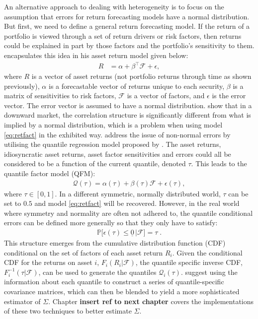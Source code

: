 \documentclass[
]{article}
\begin{document}
An alternative approach to dealing with heterogeneity is to focus on the assumption that errors for
return forecasting models have a normal distribution. But first, we need to define a general return
forecasting model. If the return of a portfolio is viewed through a set of return drivers or risk
factors, then returns could be explained in part by those factors and the portfolio's sensitivity to
them. \citet{M10} encapsulates this idea in his asset return model given below:
\begin{align}
R &= \alpha +\beta^\intercal \mathcal{F} + \epsilon, \label{eq:retfact}
\end{align}
where \(R\) is a vector of asset returns (not portfolio returns through time as shown previously),
\(\alpha\) is a forecastable vector of returns unique to each security, \(\beta\) is a matrix of
sensitivities to risk factors, \(\mathcal{F}\) is a vector of factors, and \(\epsilon\) is the error
vector. The error vector is assumed to have a normal distribution. \citet{AC02} show that in a downward
market, the correlation structure is significantly different from what is implied by a normal
distribution, which is a problem when using model \eqref{eq:retfact} in the exhibited way. \citet{CDG19}
address the issue of non-normal errors by utilising the quantile regression model proposed by
\citet{KB78}. The asset returns, idiosyncratic asset returns, asset factor sensitivities and errors could all
be considered to be a function of the current quantile, denoted \(\tau\). This leads to the quantile
factor model (QFM):
\begin{align} 
\mathcal{Q}(\tau) =  \alpha(\tau) + \beta(\tau)\mathcal{F} + \epsilon(\tau), \label{eq:qfm}
\end{align}
where \(\tau \in [0, 1]\). In a different symmetric, normally distributed world, \(\tau\) can be set to
\(0.5\) and model \eqref{eq:retfact} will be recovered. However, in the real world where symmetry and
normality are often not adhered to, the quantile conditional errors can be defined more generally so
that they only have to satisfy:
\begin{align}
\mathbb{P}\Big[\epsilon(\tau) \leq \underline{0} \, \Big | \mathcal{F} \Big] = \tau \; .
\end{align}
This structure emerges from the cumulative distribution function (CDF) conditional on the set of
factors of each asset return \(R_i\). Given the conditional CDF for the returns on asset \(i\),
\(F_i(R_i|\mathcal{F})\), the quantile specific inverse CDF, \(F^{-1}_i(\tau| \mathcal{F})\), can be used
to generate the quantiles \(\mathcal{Q}_i(\tau)\). \citet{FD18} suggest using the information about each
quantile to construct a series of quantile-specific covariance matrices, which can then be blended to
yield a more sophisticated estimator of \(\Sigma\). Chapter \textbf{insert ref to next chapter} covers the
implementations of these two techniques to better estimate \(\Sigma\).
\end{document}
